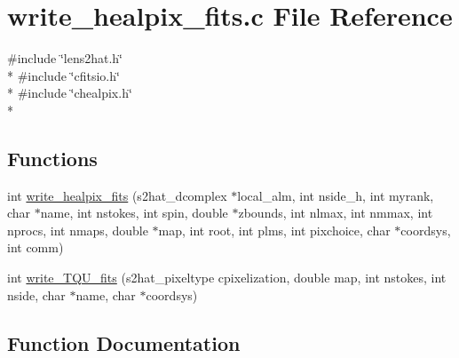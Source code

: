 \section{write\-\_\-healpix\-\_\-fits.\-c File Reference}
\label{rng_2common_2write__healpix__fits_8c}
{\ttfamily \#include \char`\"{}lens2hat.\-h\char`\"{}}\\*
{\ttfamily \#include \char`\"{}cfitsio.\-h\char`\"{}}\\*
{\ttfamily \#include \char`\"{}chealpix.\-h\char`\"{}}\\*
\subsection*{Functions}
\begin{DoxyCompactItemize}
\item 
int \hyperlink{rng_2common_2write__healpix__fits_8c_a0e8ef872d4ff0df61ae71499c14bc1fb}{write\-\_\-healpix\-\_\-fits} (s2hat\-\_\-dcomplex $\ast$local\-\_\-alm, int nside\-\_\-h, int myrank, char $\ast$name, int nstokes, int spin, double $\ast$zbounds, int nlmax, int nmmax, int nprocs, int nmaps, double $\ast$map, int root, int plms, int pixchoice, char $\ast$coordsys, int comm)
\item 
int \hyperlink{rng_2common_2write__healpix__fits_8c_ab55406f86af043b6b0440218eb38789f}{write\-\_\-\-T\-Q\-U\-\_\-fits} (s2hat\-\_\-pixeltype cpixelization, double map, int nstokes, int nside, char $\ast$name, char $\ast$coordsys)
\end{DoxyCompactItemize}


\subsection{Function Documentation}
